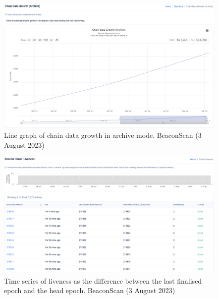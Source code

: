 \documentclass[UTF8]{article}
\begin{document}
{\begin{figure}[htbp]
\begin{center}
\includegraphics[width=\linewidth]{images/beaconscan18}
\caption{Line graph of chain data growth in archive mode. BeaconScan (3 August 2023)}
\label{fig:beaconscan18}
\end{center}
\end{figure}

\begin{figure}[htbp]
\begin{center}
\includegraphics[width=\linewidth]{images/beaconscan19}
\caption{Time series of liveness as the difference between the last finalised epoch and the head epoch. BeaconScan (3 August 2023)}
\label{fig:beaconscan19}
\end{center}
\end{figure}

\clearpage

}
\end{document}

